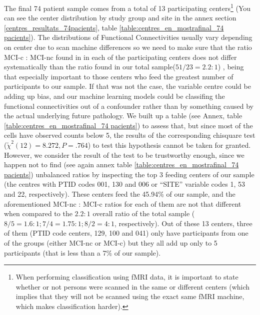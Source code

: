 \documentclass[a4paper,12pt]{elsarticle}  %
\begin{document}
		The final 74 patient sample comes from a total of 13 participating centers\footnote{When performing classification using fMRI data, it is important to state whether or not persons were scanned in the same or different centers (which implies that they will not be scanned using the exact same fMRI machine, which makes classification harder).} (You can see the center distribution by study group and site in the annex section \ref{centres_resultats_74pacients}, table \ref{table:centres_en_mostrafinal_74 pacients}). The distributions of Functional Connectivities usually vary depending on center due to  scan machine differences so we need to make sure that the ratio MCI-c : MCI-nc found in in each of the participating centers does not differ systematically than the ratio found in our total sample($51/23 = 2.2:1$) , being that especially important to those centers who feed the greatest number of participants to our sample. If that was not the case, the variable centre could be adding up bias, and our machine learning models could be classifing the functional connectivities out of a confounder rather than by something caused by the actual underlying future pathology. We built up a table (see Annex, table \ref{table:centres_en_mostrafinal_74 pacients}) to assess that, but since most of the cells have observed counts below 5, the results of the corresponding chisquare test ($\tilde{\chi}^2 (12) = 8.272, P = .764$) to test this hypothesis cannot be taken for granted. However, we consider the result of the test to be trustworthy enough, since we happen not to find (see again annex table \ref{table:centres_en_mostrafinal_74 pacients}) unbalanced ratios by inspecting the top 3 feeding centers of our sample (the centres with PTID codes 001, 130 and 006 or ``SITE'' variable codes 1, 53 and 22, respectively). These centers feed the 45.94\% of our sample, and the aforementioned MCI-nc : MCI-c ratios for each of them are not that different when compared to the $2.2 : 1$ overall ratio of the total sample ($8/5 = 1.6:1 ; 7/4 = 1.75:1 ;8/2 = 4:1 $, respectively). Out of these 13 centers, three of them (PTID code centers, 129, 100 and 041) only have participants from one of the groups (either MCI-nc or MCI-c) but they all add up only to 5 participants (that is less than a 7\% of our sample).
		
\end{document}
